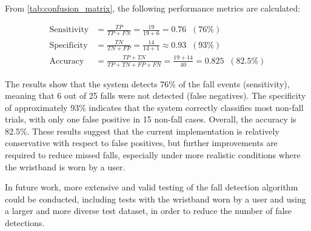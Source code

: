 From \autoref{tab:confusion_matrix}, the following performance metrics are calculated:

\begin{align}
\text{Sensitivity} &= \frac{TP}{TP+FN}
= \frac{19}{19+6}
= 0.76 \;\; (76\%) \\
\text{Specificity} &= \frac{TN}{TN+FP}
= \frac{14}{14+1}
\approx 0.93 \;\; (93\%) \\
\text{Accuracy} &= \frac{TP+TN}{TP+TN+FP+FN}
= \frac{19+14}{40}
= 0.825 \;\; (82.5\%)
\end{align}

The results show that the system detects 76\% of the fall events (sensitivity), meaning that 6 out of 25 falls were not detected (false negatives). The specificity of approximately 93\% indicates that the system correctly classifies most non-fall trials, with only one false positive in 15 non-fall cases. Overall, the accuracy is 82.5\%. These results suggest that the current implementation is relatively conservative with respect to false positives, but further improvements are required to reduce missed falls, especially under more realistic conditions where the wristband is worn by a user.

In future work, more extensive and valid testing of the fall detection algorithm could be conducted, including tests with the wristband worn by a user and using a larger and more diverse test dataset, in order to reduce the number of false detections.